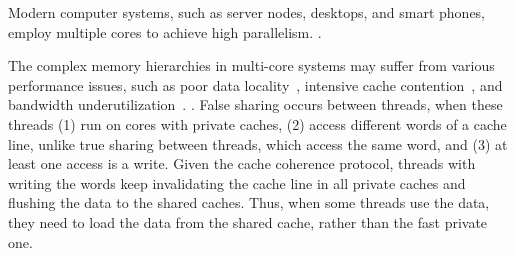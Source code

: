 Modern computer systems, such as server nodes, desktops, and smart phones, employ multiple cores to achieve high parallelism. 
.

The complex memory hierarchies in multi-core systems may suffer from various performance issues, such as poor data locality~\cite{ibs-sc,ibs-ispass}, intensive cache contention~\cite{ibs-sc2}, and bandwidth underutilization~\cite{Dramon}. . %
False sharing occurs between threads, when these threads (1) run on cores with private caches, (2) access different words of a cache line, unlike true sharing between threads, which access the same word, and (3) at least one access is a write. Given the cache coherence protocol, threads with writing the words keep invalidating the cache line in all private caches and flushing the data to the shared caches. Thus, when some threads use the data, they need to load the data from the shared cache, rather than the fast private one.



